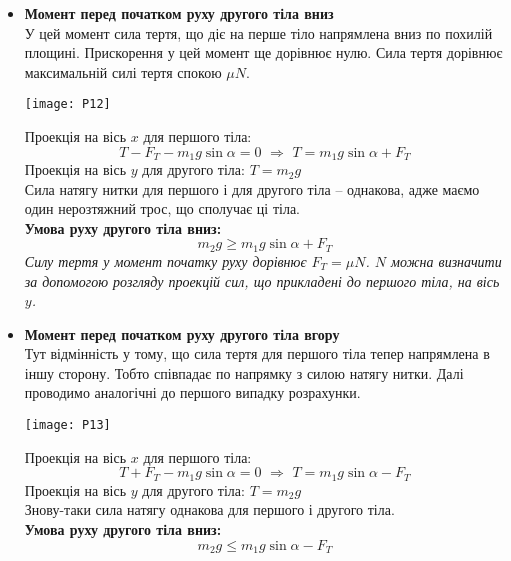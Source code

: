 \documentclass[a4paper,12pt]{article}
\begin{document}
\begin{itemize}
\item \textbf{Момент перед початком руху другого тіла вниз}\\
У цей момент сила тертя, що діє на перше тіло напрямлена вниз по похилій площині. Прискорення у цей момент ще дорівнює нулю. Сила тертя дорівнює максимальній силі тертя спокою $\mu N$.\\
\begin{center}\texttt{[image: P12]} \end{center}
Проекція на вісь $x$ для першого тіла: $$T - F_T - m_1g\sin \alpha = 0\,\,\Rightarrow\,\,T = m_1g\sin \alpha + F_T$$
Проекція на вісь $y$ для другого тіла: $T = m_2g$\\
Сила натягу нитки для першого і для другого тіла – однакова, адже маємо один нерозтяжний трос, що сполучає ці тіла. \\

\textcolor{EdErablue}{\textbf{Умова руху другого тіла вниз: $$\boxed{m_2g \geq m_1g\sin \alpha + F_T}$$}}
\textit{Силу тертя у момент початку руху дорівнює $F_T = \mu N$. $N$ можна визначити за допомогою розгляду проекцій сил, що прикладені до першого тіла,  на вісь $y$. }\newpage
\item \textbf{Момент перед початком руху другого тіла вгору}\\
Тут відмінність у тому, що сила тертя для першого тіла тепер напрямлена в іншу сторону. Тобто співпадає по напрямку з силою натягу нитки. Далі проводимо аналогічні до першого випадку розрахунки. \\
\begin{center}\texttt{[image: P13]} \end{center}
Проекція на вісь $x$ для першого тіла: $$T + F_T - m_1g\sin \alpha = 0\,\,\Rightarrow\,\,T = m_1g\sin \alpha - F_T$$
Проекція на вісь $y$ для другого тіла: $T = m_2g$\\
Знову-таки сила натягу однакова для першого і другого тіла. \\

\textcolor{EdErablue}{\textbf{Умова руху другого тіла вниз: $$\boxed{m_2g \le m_1g\sin \alpha - F_T}$$}}
\end{itemize}
\end{document}
